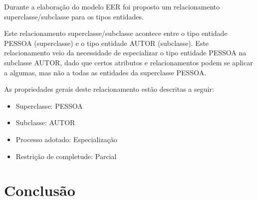 \documentclass{article}
\begin{document}
Durante a elaboração do modelo EER foi proposto um relacionamento superclasse/subclasse para os tipos entidades.

Este relacionamento superclasse/subclasse acontece entre o tipo entidade PESSOA (superclasse) e o tipo entidade AUTOR (subclasse). Este relacionamento veio da necessidade de especializar o tipo entidade PESSOA na subclasse AUTOR, dado que certos atributos e relacionamentos podem se aplicar a algumas, mas não a todas as entidades da superclasse PESSOA.

 As propriedades gerais deste relacionamento estão descritas a seguir:
 \begin{itemize}
				 \item Superclasse: PESSOA
				 \item Subclasse: AUTOR
				 \item Processo adotado: Especialização
				 \item Restrição de completude: Parcial
 \end{itemize}

\section{Conclusão}
\end{document}
